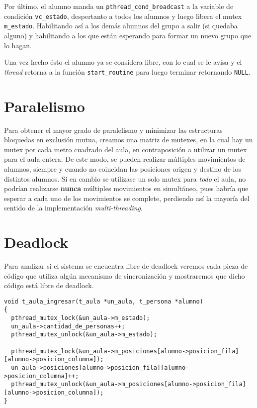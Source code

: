 \documentclass[a4paper]{article}
\begin{document}
Por último, el alumno manda un \verb|pthread_cond_broadcast| a la variable
de condición \verb|vc_estado|, despertanto a todos los alumnos y luego libera
el mutex \verb|m_estado|. Habilitando así a los demás alumnos del grupo a salir
(si quedaba alguno) y habilitando a los que están esperando para formar un
nuevo grupo que lo hagan.

Una vez hecho ésto el alumno ya se considera libre, con lo cual se le avisa
y el \textit{thread} retorna a la función \verb|start_routine| para luego
terminar retornando \verb|NULL|.


\section{Paralelismo}

Para obtener el mayor grado de paralelismo y minimizar las estructuras bloquedas
en exclusión mutua, creamos una matriz de mutexes, en la cual hay un mutex por
cada metro cuadrado del aula, en contraposición a utilizar un mutex para el aula
entera. De este modo, se pueden realizar múltiples movimientos de alumnos, siempre
y cuando no coincidan las posiciones origen y destino de los distintos alumnos.
Si en cambio se utilizase un solo mutex para \textit{todo} el aula, no podrían
realizarse \textbf{nunca} múltiples movimientos en simultáneo, pues habría que
esperar a cada uno de los movimientos se complete, perdiendo así la mayoría del
sentido de la implementación \textit{multi-threading}.


\section{Deadlock}

Para analizar si el sistema se encuentra libre de deadlock veremos cada pieza de código que utiliza algún mecanismo de sincronización y mostraremos que dicho código está libre de deadlock.

\begin{verbatim}
void t_aula_ingresar(t_aula *un_aula, t_persona *alumno)
{
  pthread_mutex_lock(&un_aula->m_estado);
  un_aula->cantidad_de_personas++;
  pthread_mutex_unlock(&un_aula->m_estado);

  pthread_mutex_lock(&un_aula->m_posiciones[alumno->posicion_fila][alumno->posicion_columna]);
  un_aula->posiciones[alumno->posicion_fila][alumno->posicion_columna]++;
  pthread_mutex_unlock(&un_aula->m_posiciones[alumno->posicion_fila][alumno->posicion_columna]);
}
\end{verbatim}
\end{document}

